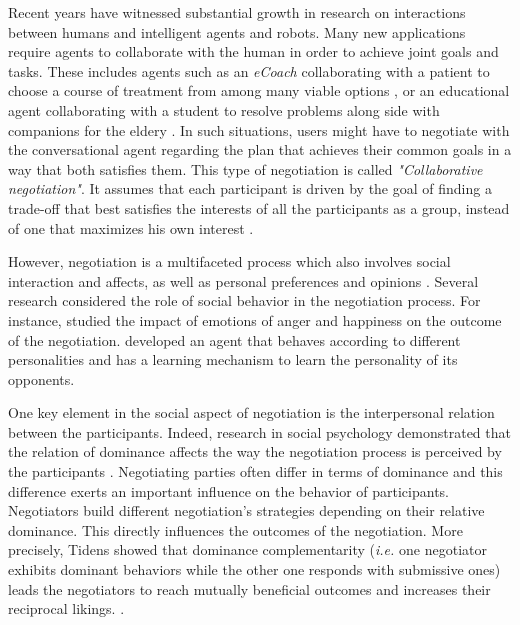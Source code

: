 \documentclass[conference, letterpaper]{IEEEtran}
\begin{document}
		Recent years have witnessed substantial growth in research on interactions between humans and intelligent agents and robots. Many new applications require agents to collaborate with the human in order to achieve joint goals and tasks. These includes agents such as an \textit{eCoach} collaborating with a patient to choose a course of treatment from among many viable options \cite{robertson2015visual}, or an educational agent collaborating with a student to resolve problems \cite{howard2017shifting} along side with companions for the eldery \cite{bickmore2005s}. In such situations, users might have to negotiate with the conversational agent regarding the plan that achieves their common goals in a way that both satisfies them. This type of negotiation is called \emph{"Collaborative negotiation"}. It assumes that each participant is driven by the goal of finding a trade-off that best satisfies the interests of all the participants as a group, instead of one that maximizes his own interest \cite{sidner1994artificial,chu1995response}.
	
	
		However, negotiation is a multifaceted process which also involves social interaction and affects, as well as personal preferences and opinions  \cite{bro2010affective}. Several research considered the role of social behavior in the negotiation process. For instance, \cite{de2011effect} studied the impact of emotions of anger and happiness on the outcome of the negotiation.  \cite{kraus1995designing} developed an agent that behaves according to different personalities	and has a learning mechanism to learn the personality of its opponents. 
	
		One key element in the social aspect of negotiation is the interpersonal relation between the participants. Indeed, research in social psychology demonstrated that the relation of dominance affects the way the negotiation process is perceived by the participants \cite{van2006power}.  
		Negotiating parties often differ in terms of dominance and this difference exerts an important influence on the behavior of participants. Negotiators build different negotiation's strategies depending on their relative dominance. This directly influences the outcomes of the negotiation. More precisely, Tidens \cite{tiedens2003power} showed that dominance complementarity (\emph{i.e.} one negotiator exhibits dominant behaviors while the other one responds with submissive ones) leads the negotiators to reach mutually beneficial outcomes and increases their reciprocal likings. \cite{wiltermuth2015benefits,tiedens2003power}.
	
\end{document}
